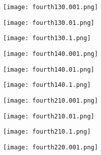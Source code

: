 \documentclass[12pt]{article}
\begin{document}
\begin{figure}[H]

	\centering
	\begin{minipage}{.5\textwidth}
		\centering
		\texttt{[image: fourth130.001.png]}
	\end{minipage}%
	\begin{minipage}{.5\textwidth}
		\centering
		\texttt{[image: fourth130.01.png]}
	\end{minipage}
\end{figure}

\begin{figure}[H]

	\centering
	\begin{minipage}{.5\textwidth}
		\centering
		\texttt{[image: fourth130.1.png]}
	\end{minipage}%
	\begin{minipage}{.5\textwidth}
		\centering
		\texttt{[image: fourth140.001.png]}
	\end{minipage}
\end{figure}

\begin{figure}[H]

	\centering
	\begin{minipage}{.5\textwidth}
		\centering
		\texttt{[image: fourth140.01.png]}
	\end{minipage}%
	\begin{minipage}{.5\textwidth}
		\centering
		\texttt{[image: fourth140.1.png]}
	\end{minipage}
\end{figure}


\begin{figure}[H]

	\centering
	\begin{minipage}{.5\textwidth}
		\centering
		\texttt{[image: fourth210.001.png]}
	\end{minipage}%
	\begin{minipage}{.5\textwidth}
		\centering
		\texttt{[image: fourth210.01.png]}
	\end{minipage}
\end{figure}

\begin{figure}[H]

	\centering
	\begin{minipage}{.5\textwidth}
		\centering
		\texttt{[image: fourth210.1.png]}
	\end{minipage}%
	\begin{minipage}{.5\textwidth}
		\centering
		\texttt{[image: fourth220.001.png]}
	\end{minipage}
\end{figure}
\end{document}
